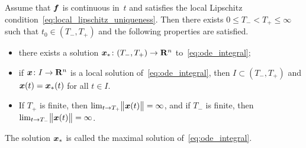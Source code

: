 \begin{corollary}
    \label{corollary:maximal_solutions}
    Assume that $\vect f$ is continuous in~$t$ and satisfies the local Lipschitz condition~\eqref{eq:local_lipschitz_uniqueness}.
    Then there exists $0 \leq T_- < T_+ \leq \infty$ such that $t_0 \in (T_-, T_+)$ and 
    the following properties are satisfied.
    \begin{itemize}
        \item
            there exists a solution $\vect x_* \colon (T_-, T_+) \to \real^n$ to~\eqref{eq:ode_integral};

        \item
            if $\vect x\colon I \to \real^n$ is a local solution of~\eqref{eq:ode_integral},
            then $I \subset (T_-, T_+)$ and $\vect x(t) = \vect x_*(t)$ for all $t \in I$.

        \item
            If $T_+$ is finite, then $\lim_{t \to T_+} \vecnorm[\big]{\vect x(t)} = \infty$,
            and if $T_-$ is finite,
            then $\lim_{t \to T_-} \vecnorm[\big]{\vect x(t)} = \infty$.
    \end{itemize}
    The solution $\vect x_*$ is called the maximal solution of~\eqref{eq:ode_integral}.
\end{corollary}

